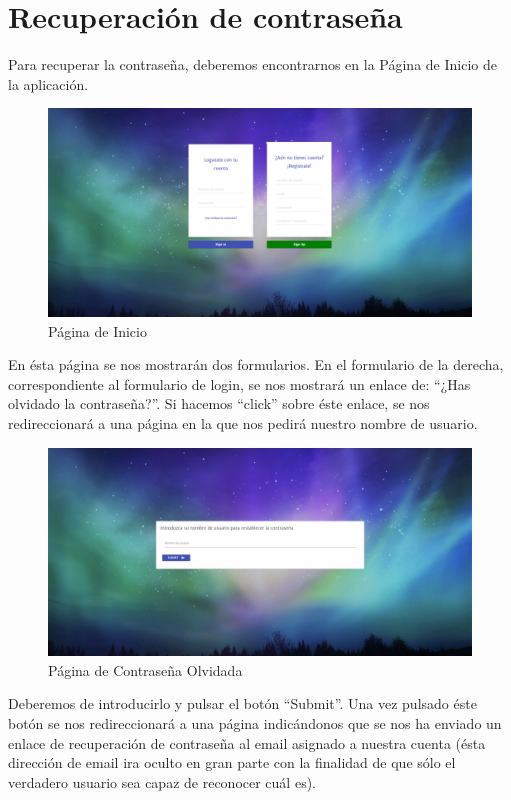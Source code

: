 \documentclass[11pt,openany]{book}
\begin{document}
\section{Recuperación de contraseña}

Para recuperar la contraseña, deberemos encontrarnos en la Página de Inicio de la aplicación.

\begin{figure}[H]
\centering
\includegraphics[totalheight=6cm]{manualUsuario/paginaInicio.png}
\caption{Página de Inicio}
\end{figure}

En ésta página se nos mostrarán dos formularios. En el formulario de la derecha, correspondiente al formulario de login, se nos mostrará un enlace de: ``¿Has olvidado la contraseña?''. Si hacemos ``click'' sobre éste enlace, se nos redireccionará a una página en la que nos pedirá nuestro nombre de usuario.

\begin{figure}[H]
\centering
\includegraphics[totalheight=6cm]{manualUsuario/contrase_aOlvidada.png}
\caption{Página de Contraseña Olvidada}
\end{figure}

Deberemos de introducirlo y pulsar el botón ``Submit''. Una vez pulsado éste botón se nos redireccionará a una página indicándonos que se nos ha enviado un enlace de recuperación de contraseña al email asignado a nuestra cuenta (ésta dirección de email ira oculto en gran parte con la finalidad de que sólo el verdadero usuario sea capaz de reconocer cuál es).
\end{document}

